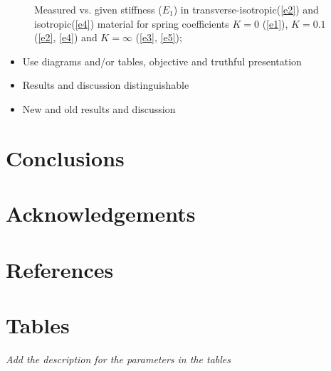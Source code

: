 \documentclass[review]{elsarticle}
\begin{document}
\begin{figure}[!ht]
\captionsetup{justification=centering}
\caption{Measured vs. given stiffness
($E_{1}$) in transverse-isotropic(\ref{e2}) and isotropic(\ref{e4}) material for
spring coefficients $K=0$ (\ref{e1}), $K=0.1$ (\ref{e2}, \ref{e4}) and
$K=\infty$ (\ref{e3}, \ref{e5});\\
\color{red}{a) total area of interest, b) chosen area of interest c)
experiment.}}


\end{figure}




\color{red}
\begin{itemize}
\item Use diagrams and/or tables, objective and truthful presentation
\item Results and discussion distinguishable
\item New and old results and discussion
\end{itemize}


\section{Conclusions}

\section*{Acknowledgements}

\section*{References}

\pagebreak


\section*{Tables}
\it{\color{red}Add the description for the parameters in the tables}
\end{document}
